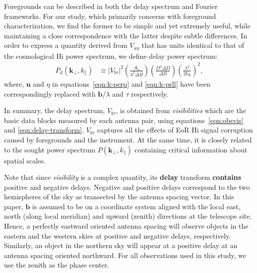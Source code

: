 \documentclass[preprint2,iop,numberedappendix]{emulateapj}
\begin{document}
Foregrounds can be described in both the delay spectrum and Fourier frameworks. For our study, which primarily concerns with foreground characterization, we find the former to be simple and yet extremely useful, while maintaining a close correspondence with the latter despite subtle differences. In order to express a quantity derived from $V_{u\eta}$ that has units identical to that of the cosmological H{\sc i} power spectrum, we define delay power spectrum:
\begin{align}\label{eqn:fake-power-spectrum}
  P_\textrm{d}(\boldsymbol{k}_\perp,k_\parallel) &\equiv |V_{b\tau}|^2\left(\frac{A_\textrm{e}}{\lambda^2\Delta B}\right)\left(\frac{D^2\Delta D}{\Delta B}\right)\left(\frac{\lambda^2}{2k_\textrm{B}}\right)^2,
\end{align}
where, $\boldsymbol{u}$ and $\eta$ in equations~\ref{eqn:k-perp} and \ref{eqn:k-prll} have been correspondingly replaced with $\boldsymbol{b}/\lambda$ and $\tau$ respectively. 

In summary, the delay spectrum, $V_{b\tau}$, is obtained from {\it visibilities} which are the basic data blocks measured by each antenna pair, using equations~\ref{eqn:obsvis} and \ref{eqn:delay-transform}. $V_{b\tau}$ captures all the effects of EoR H{\sc i} signal corruption caused by foregrounds and the instrument. At the same time, it is closely related to the sought power spectrum $P(\boldsymbol{k}_\perp,k_\parallel)$ containing critical information about spatial scales. %

Note that since {\it visibility} is a complex quantity, its {\bf delay} transform {\bf contains} positive and negative delays. Negative and positive delays correspond to the two hemispheres of the sky as transected by the antenna spacing vector. In this paper, $\boldsymbol{b}$ is assumed to be on a coordinate system aligned with the local east, north (along local meridian) and upward (zenith) directions at the telescope site. Hence, a perfectly eastward oriented antenna spacing will observe objects in the eastern and the western skies at positive and negative delays, respectively. Similarly, an object in the northern sky will appear at a positive delay at an antenna spacing oriented northward. For all observations used in this study, we use the zenith as the phase center. 
\end{document}
